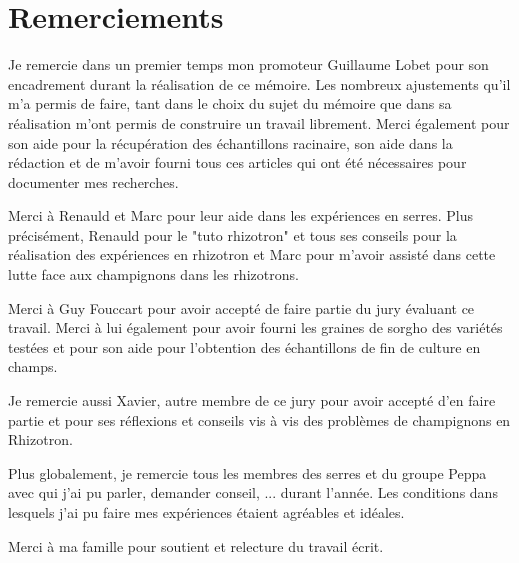 \section*{Remerciements}
\thispagestyle{empty}

Je remercie dans un premier temps mon promoteur Guillaume Lobet pour son encadrement durant la réalisation de ce mémoire.
Les nombreux ajustements qu'il m'a permis de faire, tant dans le choix du sujet du mémoire que dans sa réalisation m'ont permis de construire un travail librement.
Merci également pour son aide pour la récupération des échantillons racinaire, son aide dans la rédaction et de m'avoir fourni tous ces articles qui ont été nécessaires pour documenter mes recherches.
\newline

Merci à Renauld et Marc pour leur aide dans les expériences en serres.
Plus précisément, Renauld pour le "tuto rhizotron" et tous ses conseils pour la réalisation des expériences en rhizotron et Marc pour m'avoir assisté dans cette lutte face aux champignons dans les rhizotrons.
\newline

Merci à Guy Fouccart pour avoir accepté de faire partie du jury évaluant ce travail.
Merci à lui également pour avoir fourni les graines de sorgho des variétés testées et pour son aide pour l'obtention des échantillons de fin de culture en champs.
\newline

Je remercie aussi Xavier, autre membre de ce jury pour avoir accepté d'en faire partie et pour ses réflexions et conseils vis à vis des problèmes de champignons en Rhizotron.
\newline

Plus globalement, je remercie tous les membres des serres et du groupe Peppa avec qui j'ai pu parler, demander conseil, ... durant l'année. 
Les conditions dans lesquels j'ai pu faire mes expériences étaient agréables et idéales.
\newline

Merci à ma famille pour soutient et relecture du travail écrit.